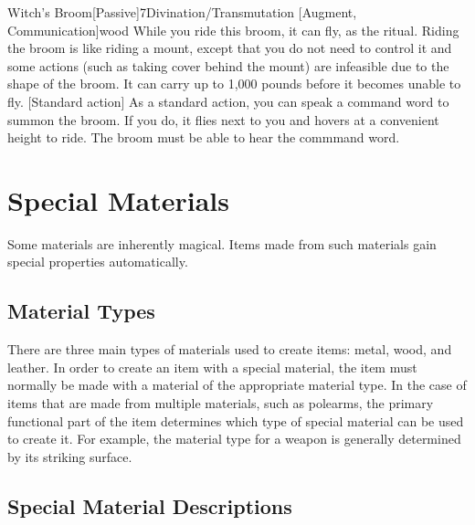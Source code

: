         \begin{magicitemdef}{Witch's Broom}[Passive]{7}{Divination/Transmutation [Augment, Communication]}{wood}
             While you ride this broom, it can fly, as the  ritual.
            Riding the broom is like riding a mount, except that you do not need to control it and some actions (such as taking cover behind the mount) are infeasible due to the shape of the broom.
            It can carry up to 1,000 pounds before it becomes unable to fly.
            [Standard action] As a standard action, you can speak a command word to summon the broom.
            If you do, it flies next to you and hovers at a convenient height to ride.
            The broom must be able to hear the commmand word.
        \end{magicitemdef}

\section{Special Materials}

    Some materials are inherently magical.
    Items made from such materials gain special properties automatically.

    \subsection{Material Types}
        There are three main types of materials used to create items: metal, wood, and leather.
        In order to create an item with a special material, the item must normally be made with a material of the appropriate material type.
        In the case of items that are made from multiple materials, such as polearms, the primary functional part of the item determines which type of special material can be used to create it.
        For example, the material type for a weapon is generally determined by its striking surface.

    \subsection{Special Material Descriptions}

